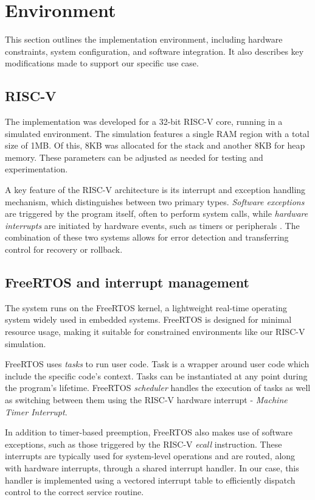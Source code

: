 \section{Environment}

This section outlines the implementation environment, including hardware constraints, system configuration, and software integration. It also describes key modifications made to support our specific use case.

\subsection{RISC-V}

The implementation was developed for a 32-bit RISC-V core, running in a simulated environment. The simulation features a single RAM region with a total size of 1MB. Of this, 8KB was allocated for the stack and another 8KB for heap memory. These parameters can be adjusted as needed for testing and experimentation.

A key feature of the RISC-V architecture is its interrupt and exception handling mechanism, which distinguishes between two primary types. \textit{Software exceptions} are triggered by the program itself, often to perform system calls, while \textit{hardware interrupts} are initiated by hardware events, such as timers or peripherals \cite{riscv:manual}. The combination of these two systems allows for error detection and transferring control for recovery or rollback.

\subsection{FreeRTOS and interrupt management}

The system runs on the FreeRTOS kernel, a lightweight real-time operating system widely used in embedded systems. FreeRTOS is designed for minimal resource usage, making it suitable for constrained environments like our RISC-V simulation.

FreeRTOS uses \textit{tasks} to run user code. Task is a wrapper around user code which include the specific code's context. Tasks can be instantiated at any point during the program's lifetime. FreeRTOS \textit{scheduler} handles the execution of tasks as well as switching between them using the RISC-V hardware interrupt - \textit{Machine Timer Interrupt}.

In addition to timer-based preemption, FreeRTOS also makes use of software exceptions, such as those triggered by the RISC-V \textit{ecall} instruction. These interrupts are typically used for system-level operations and are routed, along with hardware interrupts, through a shared interrupt handler. In our case, this handler is implemented using a vectored interrupt table to efficiently dispatch control to the correct service routine.

